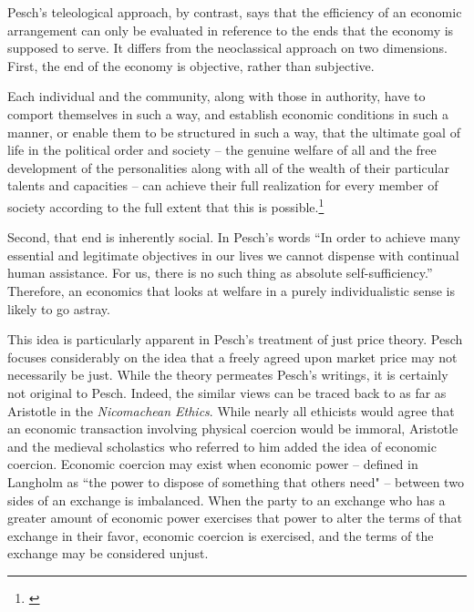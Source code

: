 \documentclass{article}
\begin{document}
Pesch’s teleological approach, by contrast, says that the efficiency of an economic arrangement can only be evaluated in reference to the ends that the economy is supposed to serve.  It differs from the neoclassical approach on two dimensions.  First, the end of the economy is objective, rather than subjective.
\begin{displayquote}
Each individual and the community, along with those in authority, have to comport themselves in such a way, and establish economic conditions in such a manner, or enable them to be structured in such a way, that the ultimate goal of life in the political order and society – the genuine welfare of all and the free development of the personalities along with all of the wealth of their particular talents and capacities – can achieve their full realization for every member of society according to the full extent that this is possible.\footnote{\citet[p.60]{pesch1998}}
\end{displayquote}
Second, that end is inherently social.  In Pesch’s words “In order to achieve many essential and legitimate objectives in our lives we cannot dispense with continual human assistance.  For us, there is no such thing as absolute self-sufficiency.” \citep[p. 7]{pesch1998}  Therefore, an economics that looks at welfare in a purely individualistic sense is likely to go astray.\medskip

This idea is particularly apparent in Pesch’s treatment of just price theory.  Pesch focuses considerably on the idea that a freely agreed upon market price may not necessarily be just.  While the theory permeates Pesch’s writings, it is certainly not original to Pesch.  Indeed, the similar views can be traced back to as far as Aristotle in the \emph{Nicomachean Ethics}.  While nearly all ethicists would agree that an economic transaction involving physical coercion would be immoral, Aristotle and the medieval scholastics who referred to him added the idea of economic coercion. \citep{langholm2014}  Economic coercion may exist when economic power – defined in Langholm as ``the power to dispose of something that others need"  – between two sides of an exchange is imbalanced.  When the party to an exchange who has a greater amount of economic power exercises that power to alter the terms of that exchange in their favor, economic coercion is exercised, and the terms of the exchange may be considered unjust.\medskip
\end{document}
